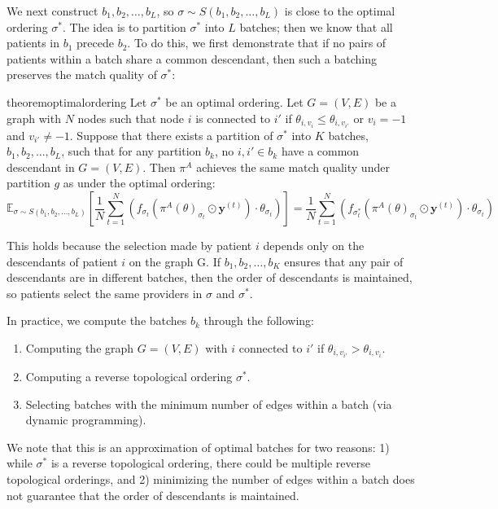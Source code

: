 We next construct $b_{1},b_{2},\ldots,b_{L}$, so $\sigma \sim S(b_{1},b_{2},\ldots,b_{L})$ is close to the optimal ordering $\sigma^{*}$. 
The idea is to partition $\sigma^{*}$ into $L$ batches; then we know that all patients in $b_{1}$ precede $b_{2}$. 
To do this, we first demonstrate that if no pairs of patients within a batch share a common descendant, then such a batching  preserves the match quality of $\sigma^{*}$:  
\begin{restatable}{theorem}{optimalordering}
    Let $\sigma^{*}$ be an optimal ordering.
    Let $G=(V,E)$ be a graph with $N$ nodes such that node $i$ is connected to $i'$ if $\theta_{i,v_{i}} \leq \theta_{i,v_{i'}}$ or $v_{i} = -1$ and $v_{i'} \neq -1$. 
    Suppose that there exists a partition of $\sigma^{*}$ into $K$ batches, $b_{1},b_{2},\ldots,b_{L}$, such that for any partition $b_{k}$, no $i, i' \in b_{k}$ have a common descendant in $G=(V,E)$. 
    Then $\pi^{A}$ achieves the same match quality under partition $g$  as under the optimal ordering: 
    \begin{equation}
        \mathbb{E}_{\sigma \sim S(b_{1},b_{2},\ldots,b_{L})}[\frac{1}{N} \sum_{t=1}^{N}  (f_{\sigma_{t}}\left(\pi^{A}(\theta)_{\sigma_{t}} \odot \mathbf{y}^{(t)}\right) \cdot \theta_{\sigma_{t}})] =\frac{1}{N}  \sum_{t=1}^{N}  (f_{\sigma^{*}_{t}}\left(\pi^{A}(\theta)_{\sigma_{t}} \odot \mathbf{y}^{(t)}\right) \cdot \theta_{\sigma_{t}}) 
    \end{equation}
\end{restatable}
This holds because the selection made by patient $i$ depends only on the descendants of patient $i$ on the graph G. 
If $b_{1},b_{2},\ldots,b_{K}$ ensures that any pair of descendants are in different batches, then the order of descendants is maintained, so patients select the same providers in $\sigma$ and $\sigma^{*}$. 

In practice, we compute the batches $b_{k}$ through the following: 
\begin{enumerate}
    \item Computing the graph $G=(V,E)$ with $i$ connected to $i'$ if $\theta_{i,v_{i'}} > \theta_{i,v_{i}}$.
    \item Computing a reverse topological ordering $\sigma^{*}$.
    \item Selecting batches with the minimum number of edges within a batch (via dynamic programming).
\end{enumerate}
We note that this is an approximation of optimal batches for two reasons: 1) while $\sigma^{*}$ is a reverse topological ordering, there could be multiple reverse topological orderings, and 2) minimizing the number of edges within a batch does not guarantee that the order of descendants is maintained. 

